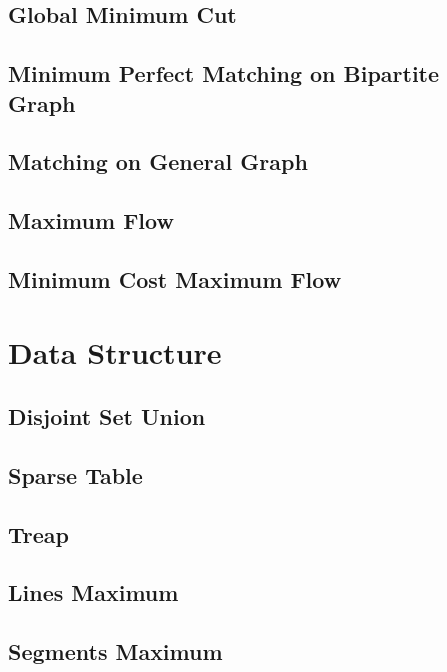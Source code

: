 \documentclass{article}
\begin{document}
\begin{multicols}{2}
    \subsection{Global Minimum Cut}
    
    \subsection{Minimum Perfect Matching on Bipartite Graph}
    
    \subsection{Matching on General Graph}
    
    \subsection{Maximum Flow}
    
    \subsection{Minimum Cost Maximum Flow}
    

    \section{Data Structure}
    \subsection{Disjoint Set Union}
    
    \subsection{Sparse Table}
    
    \subsection{Treap}
    
    \subsection{Lines Maximum}
    
    \subsection{Segments Maximum}
    

\end{multicols}
\end{document}
